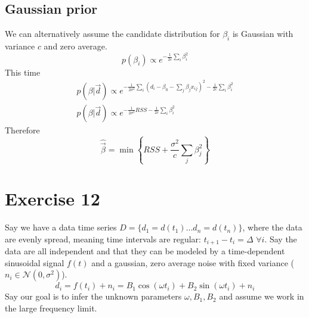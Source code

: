 \documentclass[a4paper,11pt,fleqn]{article}
\begin{document}
\subsection{Gaussian prior}
We can alternatively assume the candidate distribution for $\beta_i$ is 
Gaussian with variance $c$ and zero average.
\begin{equation}
    p(\beta_i) \propto e^{-\frac{1}{2c}\sum_i \beta_i^2}
\end{equation}
This time
\begin{gather*}
    p(\beta |\vec{d}) \propto e^{-\frac{1}{2\sigma^2}\sum_i (d_i-\beta_0-\sum_j \beta_j x_{ij})^2-\frac{1}{2c}\sum_i \beta_i^2} \\
    p(\beta |\vec{d}) \propto e^{-\frac{1}{2\sigma^2} RSS -\frac{1}{2c}\sum_i \beta_i^2}
\end{gather*}
Therefore 
\begin{equation}
    \hat{\vec{\beta}} = \min{\left\{RSS + \frac{\sigma^2}{c}\sum_j \beta_j^2\right\}}
\end{equation}



\section{Exercise 12}
Say we have a data time series $D=\{d_1=d(t_1)\dotsc d_n=d(t_n)\}$, where 
the data are evenly spread, meaning time intervals are regular: 
$t_{i+1}-t_i = \Delta$ $ \forall i$. Say the data are all independent and 
that they can be modeled by a time-dependent sinusoidal signal $f(t)$ and 
a gaussian, zero average noise with fixed variance ( $n_i \in \mathcal{N}(0,\sigma^2)$).
\begin{equation}
    d_i = f(t_i)+n_i = B_1\cos(\omega t_i) + B_2 \sin(\omega t_i) + n_i
\end{equation}
Say our goal is to infer the unknown parameters $\omega, B_1, B_2$ and 
assume we work in the large frequency limit.
\end{document}
